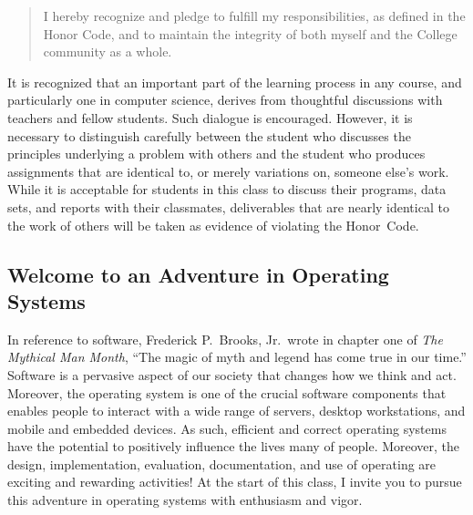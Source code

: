 \vspace*{-.1in}
\begin{quote}
I hereby recognize and pledge to fulfill my responsibilities, as defined in the Honor Code, and to maintain the
integrity of both myself and the College community as a whole.
\end{quote}
\vspace*{-.15in}

\noindent It is recognized that an important part of the learning process in any course, and particularly one in
computer science, derives from thoughtful discussions with teachers and fellow students.  Such dialogue is encouraged.
However, it is necessary to distinguish carefully between the student who discusses the principles underlying a problem
with others and the student who produces assignments that are identical to, or merely variations on, someone else's
work.  While it is acceptable for students in this class to discuss their programs, data sets, and reports with their
classmates, deliverables that are nearly identical to the work of others will be taken as evidence of violating the
\mbox{Honor Code}.

\subsection*{Welcome to an Adventure in Operating Systems}

In reference to software, Frederick P.\ Brooks, Jr.\ wrote in chapter one of {\em The Mythical Man Month}, ``The magic
of myth and legend has come true in our time.'' Software is a pervasive aspect of our society that changes how we think
and act. Moreover, the operating system is one of the crucial software components that enables people to interact with a
wide range of servers, desktop workstations, and mobile and embedded devices.  As such, efficient and correct operating
systems have the potential to positively influence the lives many of people.  Moreover, the design, implementation,
evaluation, documentation, and use of operating are exciting and rewarding activities!  At the start of this class, I
invite you to pursue this adventure in operating systems with enthusiasm and vigor.


